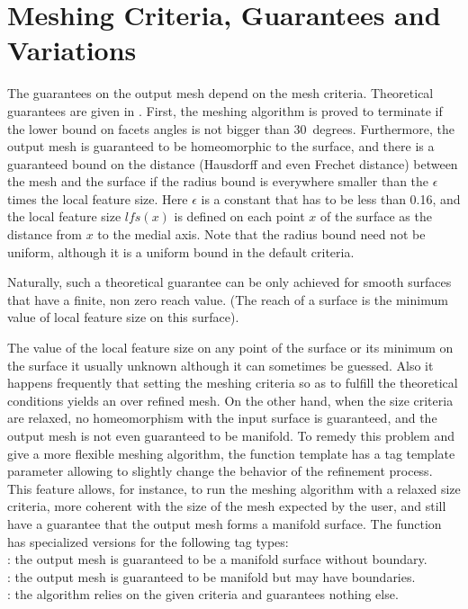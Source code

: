 
\section{Meshing Criteria, Guarantees and Variations\label{SurfaceMesher_section_criteria}}
\label{SurfaceMesher_section_variations}

The guarantees on the output mesh depend on the mesh criteria.
Theoretical guarantees are given in \cite{cgal:bo-pgsms-05}.
First, the meshing algorithm is proved to terminate
if the lower bound on facets angles  is
not bigger than $30$~degrees.
Furthermore, the output mesh
is guaranteed to be homeomorphic to the surface,
and  there is a guaranteed bound
on the  distance (Hausdorff and even Frechet distance)
between the mesh and the surface
if the radius bound is everywhere smaller than
the $\epsilon$ times the local feature size.
Here $\epsilon$ is a constant that has to be
less than 0.16, and the local feature size
$lfs(x)$ is defined on each point $x$ of the surface
as the distance from $x$ to the medial axis.
Note that the radius bound need not be uniform,
although it is a uniform bound in the default criteria.

Naturally, such a theoretical guarantee can be only achieved
for smooth surfaces that have a finite, non zero
reach value. (The reach of a surface is the minimum value
of local feature size on
this surface).

The value of the local feature size on any point of the surface
or its minimum on the surface it usually unknown
although it can sometimes be guessed. Also it happens frequently
that setting the meshing criteria so as to fulfill the theoretical
conditions yields an over refined mesh.
On the other hand, when the size criteria are relaxed,
no homeomorphism with the input surface is guaranteed,
and the output mesh is not even guaranteed to be manifold.
To remedy this problem and give a more flexible
meshing algorithm, the function template
 has a tag template parameter
allowing to slightly change the behavior of the refinement process.
This feature allows, for instance,  to run the meshing
algorithm with a relaxed size criteria, more coherent
with the size of the mesh expected by the user,
and still have a guarantee that
the output mesh forms a manifold surface.
The function  has specialized versions
for the following  tag types: \\
: the output mesh is guaranteed to be a manifold
surface without boundary.\\
: the output mesh is guaranteed to be
manifold but may have boundaries.\\
: the algorithm relies on the given criteria and
guarantees nothing else.

